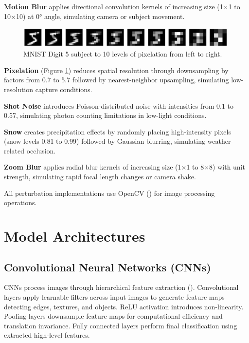 \textbf{Motion Blur} applies directional convolution kernels of increasing size (1×1 to 10×10) at 0° angle, simulating camera or subject movement.

\begin{figure}[h]
\centering
\includegraphics[width=0.99\textwidth]{Figures/Methods/Pixelation_Digit_5_1_to_10_intensity.png}
\caption{MNIST Digit 5 subject to 10 levels of pixelation from left to right.}
\label{fig:Pixelation_Digit_5_1_to_10_intensity}
\end{figure}

\textbf{Pixelation} (Figure \ref{fig:Pixelation_Digit_5_1_to_10_intensity}) reduces spatial resolution through downsampling by factors from 0.7 to 5.7 followed by nearest-neighbor upsampling, simulating low-resolution capture conditions.

\textbf{Shot Noise} introduces Poisson-distributed noise with intensities from 0.1 to 0.57, simulating photon counting limitations in low-light conditions.

\textbf{Snow} creates precipitation effects by randomly placing high-intensity pixels (snow levels 0.81 to 0.99) followed by Gaussian blurring, simulating weather-related occlusion.

\textbf{Zoom Blur} applies radial blur kernels of increasing size (1×1 to 8×8) with unit strength, simulating rapid focal length changes or camera shake.

All perturbation implementations use OpenCV (\cite{opencv}) for image processing operations.


\section{Model Architectures}


\subsection{Convolutional Neural Networks (CNNs)} 

CNNs process images through hierarchical feature extraction (\cite{lecun1998gradient}). Convolutional layers apply learnable filters across input images to generate feature maps detecting edges, textures, and objects. ReLU activation introduces non-linearity. Pooling layers downsample feature maps for computational efficiency and translation invariance. Fully connected layers perform final classification using extracted high-level features.

